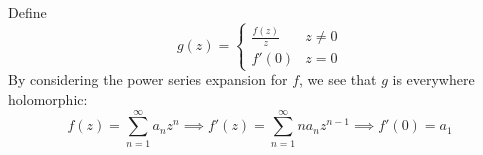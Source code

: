 \documentclass{homework}
\begin{document}
                                                                                                                                                                                                                                                                  \begin{solution}
                                                                                                                                                                                                                                                                  Define 
                                                                                                                                                                                                                                                                  \[
                                                                                                                                                                                                                                                                  g(z) = \begin{cases}\frac{f(z)}{z} & z \neq 0 \\ f'(0) & z= 0\end{cases}
                                                                                                                                                                                                                                                                  \]
                                                                                                                                                                                                                                                                  By considering the power series expansion for $f$, we see that $g$ is everywhere holomorphic:
                                                                                                                                                                                                                                                                  \[
                                                                                                                                                                                                                                                                  f(z) =  \sum_{n=1}^\infty a_nz^n \implies f'(z) = \sum_{n=1}^\infty na_nz^{n-1} \implies f'(0) = a_1 
                                                                                                                                                                                                                                                                  \]

\end{solution}
\end{document}
